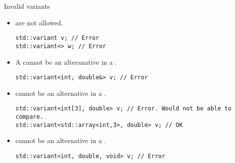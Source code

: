 \begin{frame}[t,fragile]{Invalid variants}
\begin{itemize}
  \item {} are not allowed.
\begin{lstlisting}
std::variant v; // Error
std::variant<> w; // Error
\end{lstlisting}

  \item A  cannot be an alteranative in a .
\begin{lstlisting}
std::variant<int, double&> v; // Error  
\end{lstlisting}

  \item {} cannot be an alternative in a .
\begin{lstlisting}
std::variant<int[3], double> v; // Error. Would not be able to compare.
std::variant<std::array<int,3>, double> v; // OK
\end{lstlisting}

  \item {} cannot be an alternative in a .
\begin{lstlisting}
std::variant<int, double, void> v; // Error
\end{lstlisting}

\end{itemize}
\end{frame}
